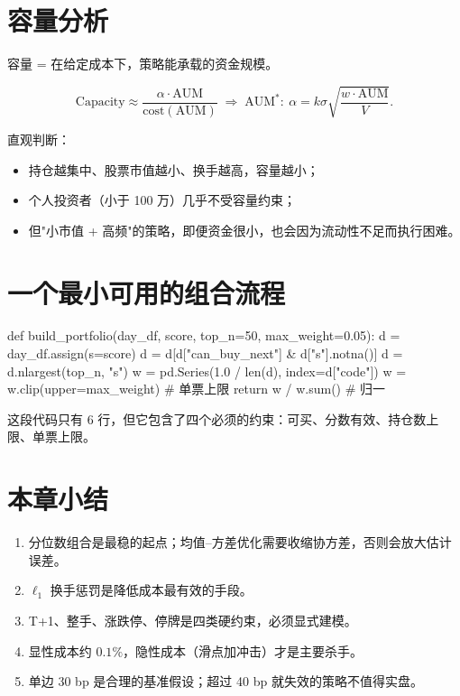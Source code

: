 \section{容量分析}

容量 = 在给定成本下，策略能承载的资金规模。

\begin{equation}
  \text{Capacity} \approx \frac{\alpha \cdot \mathrm{AUM}}{\text{cost}(\mathrm{AUM})}
  \;\Rightarrow\;
  \mathrm{AUM}^* : \ \alpha = k\sigma\sqrt{\frac{w\cdot \mathrm{AUM}}{V}}.
\end{equation}

直观判断：
\begin{itemize}
  \item 持仓越集中、股票市值越小、换手越高，容量越小；
  \item 个人投资者（小于 100 万）几乎不受容量约束；
  \item 但"小市值 + 高频"的策略，即便资金很小，也会因为流动性不足而执行困难。
\end{itemize}

\section{一个最小可用的组合流程}

\begin{pycode}[从分数到持仓]
def build_portfolio(day_df, score, top_n=50, max_weight=0.05):
    d = day_df.assign(s=score)
    d = d[d["can_buy_next"] & d["s"].notna()]
    d = d.nlargest(top_n, "s")
    w = pd.Series(1.0 / len(d), index=d["code"])
    w = w.clip(upper=max_weight)      # 单票上限
    return w / w.sum()                 # 归一
\end{pycode}

这段代码只有 6 行，但它包含了四个必须的约束：可买、分数有效、持仓数上限、单票上限。

\section{本章小结}

\begin{enumerate}
  \item 分位数组合是最稳的起点；均值--方差优化需要收缩协方差，否则会放大估计误差。
  \item $\ell_1$ 换手惩罚是降低成本最有效的手段。
  \item T+1、整手、涨跌停、停牌是四类硬约束，必须显式建模。
  \item 显性成本约 $0.1\%$，隐性成本（滑点加冲击）才是主要杀手。
  \item 单边 30 bp 是合理的基准假设；超过 40 bp 就失效的策略不值得实盘。
\end{enumerate}
